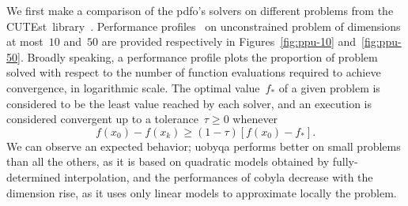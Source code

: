 \documentclass[11pt,draft]{article}
\numberwithin{equation}{section}
\def\obj{\ensuremath{f}}
\newcommand\iter[1][k]{x_{#1}}
\def\cutest{\mbox{CUTEst}}
\begin{document}
We first make a comparison of the \gls{pdfo}'s solvers on different problems from the \cutest\ library~\cite{Gould_Orban_Toint_2015}.
Performance profiles~\cite{Dolan_More_2002, More_Wild_2009} on unconstrained problem of dimensions at most~$10$ and~$50$ are provided respectively in Figures~\ref{fig:ppu-10} and~\ref{fig:ppu-50}.
Broadly speaking, a performance profile plots the proportion of problem solved with respect to the number of function evaluations required to achieve convergence, in logarithmic scale.
The optimal value~$\obj_{\ast}$ of a given problem is considered to be the least value reached by each solver, and an execution is considered convergent up to a tolerance~$\tau \ge 0$ whenever
\begin{equation}
    \label{eq:cvt}
    \obj(\iter[0]) - \obj(\iter) \ge (1 - \tau) [\obj(\iter[0]) - \obj_{\ast}].
\end{equation}
We can observe an expected behavior; \gls{uobyqa} performs better on small problems than all the others, as it is based on quadratic models obtained by fully-determined interpolation, and the performances of \gls{cobyla} decrease with the dimension rise, as it uses only linear models to approximate locally the problem.
\end{document}
